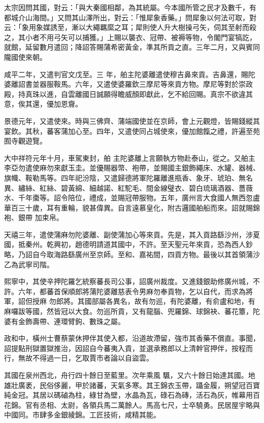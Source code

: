 \begin{pinyinscope}
 太宗因問其國，對云：「與大秦國相鄰，為其統屬。今本國所管之民才及數千，有都城介山海間。」又問其山澤所出，對云：「惟犀象香藥。」問犀象以何法可取，對云：「象用象媒誘至，漸以大繩羈縻之耳；犀則使人升大樹操弓矢，伺其至射而殺之，其小者不用弓矢可以捕獲。」上賜以襲衣、冠帶、被褥等物，令閣門宴犒訖，就館，延留數月遣回；降詔答賜蒲希密黃金，準其所貢之直。三年二月，又與賓同隴國使來朝。



 咸平二年，又遣判官文戊至。三
 年，舶主陀婆離遣使穆吉鼻來貢。吉鼻還，賜陀婆離詔書並器服鞍馬。六年，又遣使婆羅欽三摩尼等來貢方物。摩尼等對於崇政殿，持真珠以進，自雲離國日誠願得瞻威顏即獻此，乞不給回賜。真宗不欲違其意，俟其還，優加恩齎。



 景德元年，又遣使來。時與三佛齊、蒲端國使並在京師，會上元觀燈，皆賜錢縱其宴飲。其秋，蕃客蒲加心至。四年，又遣使同占城使來，優加館餼之禮，許遍至苑囿寺觀遊覽。



 大中祥符元年十月，車駕東封，舶
 主陀婆離上言願執方物赴泰山，從之。又舶主李亞勿遣使麻勿來獻玉圭。並優賜器幣、袍帶，並賜國主銀飾繩床、水罐、器械、旗幟、鞍勒馬等。四年祀汾陰，又遣歸德將軍陀羅離進瓶香、象牙、琥珀、無名異、繡絲、紅絲、碧黃綿、細越諾、紅駝毛、間金線璧衣、碧白琉璃酒器、薔薇水、千年棗等。詔令陪位，禮成，並賜冠帶服物。五年，廣州言大食國人無西忽盧華百三十歲，耳有重輪，貌甚偉異。自言遠慕皇化，附古邏國舶船而來。詔就賜錦袍、銀帶
 加束帛。



 天禧三年，遣使蒲麻勿陀婆離、副使蒲加心等來貢。先是，其入貢路繇沙州，涉夏國，抵秦州。乾興初，趙德明請道其國中，不許。至天聖元年來貢，恐為西人鈔略，乃詔自今取海路繇廣州至京師。至和、嘉祐間，四貢方物。最後以其首領蒲沙乙為武寧司階。



 熙寧中，其使辛押陀羅乞統察蕃長司公事，詔廣州裁度。又進錢銀助修廣州城，不許。六年，都蕃首保順郎將蒲陀婆離慈表令男麻勿奉貢物，乞以自代，而求為將軍，詔但授麻
 勿郎將。其國部屬各異名，故有勿巡，有陀婆離，有俞盧和地，有麻囉跋等國，然皆冠以大食。勿巡所貢，又有龍腦、兜羅錦、球錦袂、蕃花簟，陀婆有金飾壽帶、連環臂鉤、數珠之屬。



 政和中，橫州士曹蔡蒙休押伴其使入都，沿道故滯留，強市其香藥不償直。事聞，詔提點刑獄置獄推治，因詔自今蕃夷入貢，並選承務郎以上清幹官押伴，按程而行，無故不得過一日，乞取賈市者論以自盜雲。



 其國在泉州西北，舟行四十餘日至藍里。次年乘風
 颿，又六十餘日始達其國。地雄壯廣袤，民俗侈麗，甲於諸蕃，天氣多寒。其王錦衣玉帶，躡金履，朔望冠百寶純金冠。其居以碼磠為柱，綠甘為壁，水晶為瓦，碌石為磚，活石為灰，帷幕用百花錦。官有丞相、太尉，各領兵馬二萬餘人。馬高七尺，士卒驍勇。民居屋宇略與中國同。市肆多金銀綾錦。工匠技術，咸精其能。




\end{pinyinscope}
